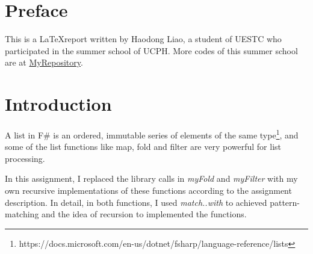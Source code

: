 \documentclass{article}
\begin{document}





\section{Preface}

This is a \LaTeX report written by Haodong Liao, a student of UESTC who participated in the summer school of UCPH. More codes of this summer school are at \href{https://github.com/Medill-East/ComputerScience/tree/master/Professional%20Core%20Courses/Functional%20Programming/SummerSchool}{MyRepository}.

\section{Introduction}

A list in F\# is an ordered, immutable series of elements of the same type\footnote[1]{https://docs.microsoft.com/en-us/dotnet/fsharp/language-reference/lists}, and some of the list functions like map, fold and filter are very powerful for list processing. 

In this assignment, I replaced the library calls in \emph{myFold} and \emph{myFilter} with my own recursive implementations of these functions according to the assignment description. In detail, in both functions, I used \emph{match..with} to achieved pattern-matching and the idea of recursion to implemented the functions.


\end{document}
